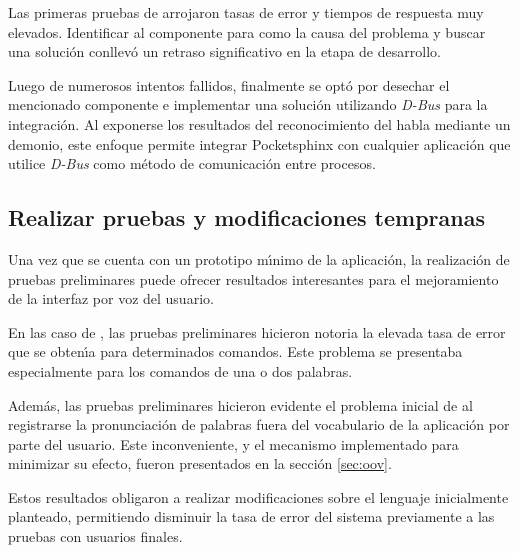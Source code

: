 Las primeras pruebas de  arrojaron tasas de error y tiempos de
respuesta muy elevados. Identificar al componente para  como la causa del problema
y buscar una soluci\'on conllev\'o un retraso significativo en la etapa de desarrollo.

Luego de numerosos intentos fallidos, finalmente se opt\'o por desechar el mencionado componente
e implementar una soluci\'on utilizando \emph{D-Bus} para la integraci\'on. Al exponerse los
resultados del reconocimiento del habla mediante un demonio, este enfoque permite integrar
Pocketsphinx con cualquier aplicaci\'on que utilice \emph{D-Bus} como m\'etodo de comunicaci\'on
entre procesos.

\subsection{Realizar pruebas y modificaciones tempranas}
Una vez que se cuenta con un prototipo m{\'\i}nimo de la aplicaci\'on, la realizaci\'on de pruebas preliminares
puede ofrecer resultados interesantes para el mejoramiento de la 
interfaz por voz del usuario.

En las caso de , las pruebas preliminares hicieron notoria la elevada tasa
de error que se obten{\'\i}a para determinados comandos. Este problema se presentaba especialmente para
los comandos de una o dos palabras.

Adem\'as, las pruebas preliminares hicieron evidente el problema inicial de 
al registrarse la pronunciaci\'on de palabras fuera del vocabulario de la aplicaci\'on por parte del usuario.
Este inconveniente, y el mecanismo implementado para minimizar su efecto, fueron presentados en la 
secci\'on \ref{sec:oov}. 

Estos resultados obligaron a realizar modificaciones sobre el lenguaje inicialmente planteado,
permitiendo disminuir la tasa de error del sistema previamente a las pruebas con usuarios
finales.